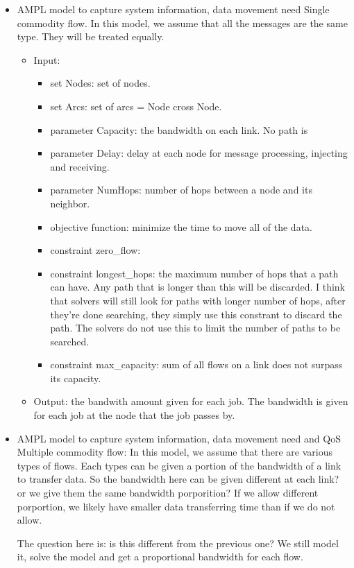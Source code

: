 \documentclass[letter]{article}
\begin{document}
\begin{itemize}
\item AMPL model to capture system information, data movement need
Single commodity flow. In this model, we assume that all the messages are the same type. They will be treated equally.
\begin{itemize}
\item Input:
\begin{itemize}
\item set Nodes: set of nodes.
\item set Arcs: set of arcs = Node cross Node.
\item parameter Capacity: the bandwidth on each link. No path is 
\item parameter Delay: delay at each node for message processing, injecting and receiving.
\item parameter NumHops: number of hops between a node and its neighbor.
\item objective function: minimize the time to move all of the data.
\item constraint zero\_flow: 
\item constraint longest\_hops: the maximum number of hops that a path can have. Any path that is longer than this will be discarded. I think that solvers will still look for paths with longer number of hops, after they're done searching, they simply use this constrant to discard the path. The solvers do not use this to limit the number of paths to be searched.
\item constraint max\_capacity: sum of all flows on a link does not surpass its capacity.
\end{itemize}
\item Output: the bandwith amount given for each job. The bandwidth is given for each job at the node that the job passes by. 
\end{itemize}

\item AMPL model to capture system information, data movement need and QoS 
Multiple commodity flow: In this model, we assume that there are various types of flows. Each types can be given a portion of the bandwidth of a link to transfer data. So the bandwidth here can be given different at each link? or we give them the same bandwidth porporition? If we allow different porportion, we likely have smaller data transferring time than if we do not allow.

The question here is: is this different from the previous one? We still model it, solve the model and get a proportional bandwidth for each flow.


\end{itemize}
\end{document}
